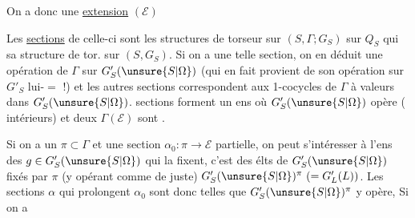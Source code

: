 On a donc une \uline{extension}
\hfill $(\mathcal E)$

\inserted{$\pi$}

Les \uline{sections} de celle-ci sont les structures de torseur sur $(S,\Gamma;G_S)$ sur $Q_S$ qui
 sa structure de tor. sur $(S,G_S)$.
Si on a une telle section, on en déduit une opération de $\Gamma$ sur $G'_S(\unsure{S|\Omega})$
(qui en fait provient de son opération sur $G'_S$ lui-$=$ !)
et les autres sections correspondent aux 1-cocycles de $\Gamma$ à valeurs dans $G'_S(\unsure{S|\Omega})$.
 sections
forment  un ens où $G'_S(\unsure{S|\Omega})$ opère
( intérieurs) et deux 
$\Gamma(\mathcal E)$ sont
.

Si on a un  $\pi\subset\Gamma$ et une section
$\alpha_0:\pi\longrightarrow\mathcal E$ partielle, on peut s'intéresser
à l'ens des $g\in G'_S(\unsure{S|\Omega})$ qui la fixent, c'est  des
élts de $G'_S(\unsure{S|\Omega})$ fixés par $\pi$ (y opérant comme de juste)
$G'_S(\unsure{S|\Omega})^\pi\ (=G'_L(L))$.
Les sections $\alpha$ qui prolongent $\alpha_0$ sont donc telles que
$G'_S(\unsure{S|\Omega})^\pi$ y opère, Si on a
